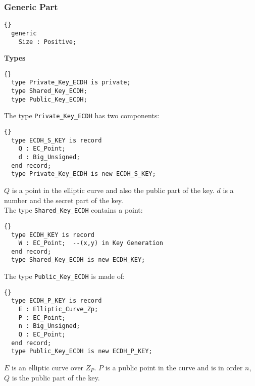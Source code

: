 \subsubsection*{Generic Part}
\begin{lstlisting}{}
  generic
    Size : Positive;
\end{lstlisting}
\textbf{Types}
\begin{lstlisting}{}
  type Private_Key_ECDH is private;
  type Shared_Key_ECDH;
  type Public_Key_ECDH;
\end{lstlisting}
The type \texttt{Private\_Key\_ECDH} has two components:
\begin{lstlisting}{}
  type ECDH_S_KEY is record
    Q : EC_Point; 
    d : Big_Unsigned;
  end record;
  type Private_Key_ECDH is new ECDH_S_KEY;
\end{lstlisting}
$Q$ is a point in the elliptic curve and also the public part of the key. $d$ is a number and the secret part of the key.\\
The type \texttt{Shared\_Key\_ECDH} contains a point:
\begin{lstlisting}{}
  type ECDH_KEY is record
    W : EC_Point;  --(x,y) in Key Generation
  end record;
  type Shared_Key_ECDH is new ECDH_KEY;
\end{lstlisting}
The type \texttt{Public\_Key\_ECDH} is made of:
\begin{lstlisting}{}
  type ECDH_P_KEY is record
    E : Elliptic_Curve_Zp;
    P : EC_Point;
    n : Big_Unsigned;
    Q : EC_Point;
  end record;
  type Public_Key_ECDH is new ECDH_P_KEY;
\end{lstlisting}
$E$ is an elliptic curve over $Z_P$. $P$ is a public point in the
curve and is in order $n$, $Q$ is the public part of the key.

